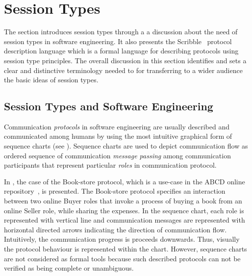\section{Session Types}
\label{sec:session_types}


The section introduces session types through a
a discussion about the need of session types in
software engineering.
It also presents the Scribble~\cite{scribble} protocol
description language which is a formal language for describing
protocols using session type principles.
The overall discussion in this section identifies and sets
a clear and distinctive terminology needed to
for transferring to a wider audience the basic ideas of session
types.

\subsection{Session Types and Software Engineering}%
\label{sec:sessions_software}



Communication \emph{protocols} in software engineering
are usually described and communicated among humans
by using the most intuitive graphical form of sequence charts
(see ).
Sequence charts are used to depict communication flow as ordered
sequence of communication \emph{message passing} among communication
participants that represent particular \emph{roles} in communication
protocol.

In , the case of the Book-store protocol, which is a use-case
in the ABCD online repository~\cite{usecase_repository},  is presented.
The Book-store protocol specifies an interaction between two online Buyer roles
that invoke a process of buying a book from an online Seller role, while
sharing the expenses.
In the sequence chart, each role is represented with vertical line and
communication messages are represented with horizontal directed arrows
indicating the direction of communication flow.
Intuitively, the communication progress is proceeds downwards.
Thus, visually the protocol behaviour is represented within the chart.
However, sequence charts are not considered as formal tools because
such described protocols can not be verified as being complete or unambiguous.

